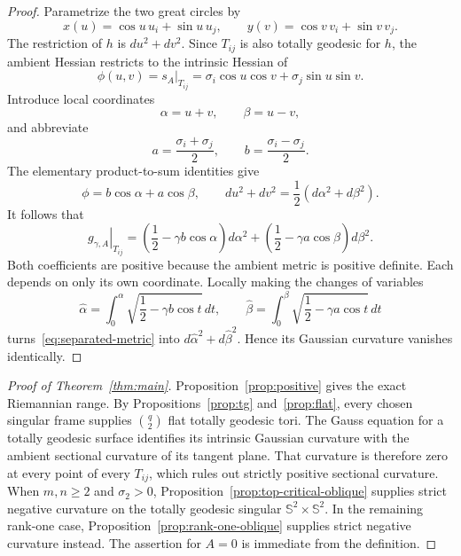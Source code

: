 \documentclass[11pt]{amsart}
\theoremstyle{definition}
\theoremstyle{remark}
\newcommand{\Sph}{\mathbb S}
\newcommand{\restr}[2]{\left.#1\right|_{#2}}
\begin{document}
\begin{proof}
Parametrize the two great circles by
\[
 x(u)=\cos u\,u_i+\sin u\,u_j,
 \qquad
 y(v)=\cos v\,v_i+\sin v\,v_j.
\]
The restriction of $h$ is $du^2+dv^2$.  Since $T_{ij}$ is also
totally geodesic for $h$, the ambient Hessian restricts to the
intrinsic Hessian of
\begin{equation}\label{eq:phi-uv}
 \phi(u,v)=\restr{s_A}{T_{ij}}
 =\sigma_i\cos u\cos v+\sigma_j\sin u\sin v.
\end{equation}
Introduce local coordinates
\[
 \alpha=u+v,\qquad \beta=u-v,
\]
and abbreviate
\begin{equation}\label{eq:ab}
 a=\frac{\sigma_i+\sigma_j}{2},
 \qquad b=\frac{\sigma_i-\sigma_j}{2}.
\end{equation}
The elementary product-to-sum identities give
\[
 \phi=b\cos\alpha+a\cos\beta,
 \qquad
 du^2+dv^2=\frac12(d\alpha^2+d\beta^2).
\]
It follows that
\begin{equation}\label{eq:separated-metric}
 \restr{g_{\gamma,A}}{T_{ij}}
 =\left(\frac12-\gamma b\cos\alpha\right)d\alpha^2
  +\left(\frac12-\gamma a\cos\beta\right)d\beta^2.
\end{equation}
Both coefficients are positive because the ambient metric is positive
definite.  Each depends on only its own coordinate.  Locally making
the changes of variables
\[
 \widehat\alpha=\int_0^\alpha
 \sqrt{\frac12-\gamma b\cos t}\,dt,
 \qquad
 \widehat\beta=\int_0^\beta
 \sqrt{\frac12-\gamma a\cos t}\,dt
\]
turns~\eqref{eq:separated-metric} into
$d\widehat\alpha^2+d\widehat\beta^2$.  Hence its Gaussian curvature
vanishes identically.
\end{proof}

\begin{proof}[Proof of Theorem~\ref{thm:main}]
Proposition~\ref{prop:positive} gives the exact Riemannian range.  By
Propositions~\ref{prop:tg} and~\ref{prop:flat}, every chosen singular
frame supplies $\binom q2$ flat totally geodesic tori.  The Gauss
equation for a totally geodesic surface identifies
its intrinsic Gaussian curvature with the ambient sectional curvature
of its tangent plane.  That curvature is therefore zero at every
point of every $T_{ij}$, which rules out strictly positive sectional
curvature.  When $m,n\geq2$ and $\sigma_2>0$,
Proposition~\ref{prop:top-critical-oblique} supplies strict negative
curvature on the totally geodesic singular
$\Sph^2\times\Sph^2$.  In the remaining rank-one case,
Proposition~\ref{prop:rank-one-oblique} supplies strict negative
curvature instead.  The assertion for $A=0$ is immediate from the
definition.
\end{proof}
\end{document}
